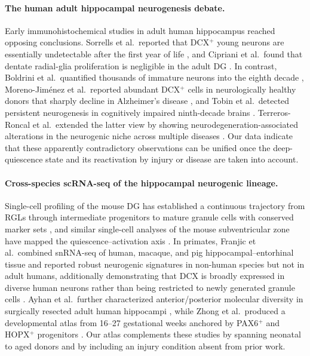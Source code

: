 \paragraph{The human adult hippocampal neurogenesis debate.}
Early immunohistochemical studies in adult human hippocampus reached opposing conclusions. Sorrells et al.\ reported that DCX$^{+}$ young neurons are essentially undetectable after the first year of life \cite{sorrells2018human}, and Cipriani et al.\ found that dentate radial-glia proliferation is negligible in the adult DG \cite{cipriani2018hippocampal}. In contrast, Boldrini et al.\ quantified thousands of immature neurons into the eighth decade \cite{boldrini2018human}, Moreno-Jim\'{e}nez et al.\ reported abundant DCX$^{+}$ cells in neurologically healthy donors that sharply decline in Alzheimer's disease \cite{morenojimenez2019adult}, and Tobin et al.\ detected persistent neurogenesis in cognitively impaired ninth-decade brains \cite{tobin2019human}. Terreros-Roncal et al.\ extended the latter view by showing neurodegeneration-associated alterations in the neurogenic niche across multiple diseases \cite{terrerosroncal2021impact}. Our data indicate that these apparently contradictory observations can be unified once the deep-quiescence state and its reactivation by injury or disease are taken into account.

\paragraph{Cross-species scRNA-seq of the hippocampal neurogenic lineage.}
Single-cell profiling of the mouse DG has established a continuous trajectory from RGLs through intermediate progenitors to mature granule cells with conserved marker sets \cite{hochgerner2018conserved}, and similar single-cell analyses of the mouse subventricular zone have mapped the quiescence--activation axis \cite{dulken2017single,llorensbobadilla2015single}. In primates, Franjic et al.\ combined snRNA-seq of human, macaque, and pig hippocampal--entorhinal tissue and reported robust neurogenic signatures in non-human species but not in adult humans, additionally demonstrating that DCX is broadly expressed in diverse human neurons rather than being restricted to newly generated granule cells \cite{franjic2022transcriptomic}. Ayhan et al.\ further characterized anterior/posterior molecular diversity in surgically resected adult human hippocampi \cite{ayhan2021resolving}, while Zhong et al.\ produced a developmental atlas from 16--27 gestational weeks anchored by PAX6$^{+}$ and HOPX$^{+}$ progenitors \cite{zhong2020decoding}. Our atlas complements these studies by spanning neonatal to aged donors and by including an injury condition absent from prior work.

